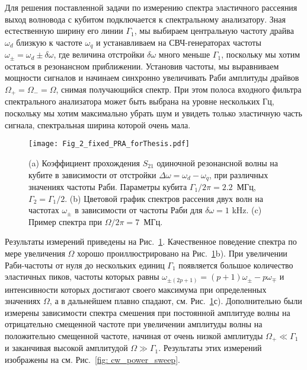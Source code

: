 Для решения поставленной задачи по измерению спектра эластичного рассеяния выход волновода с кубитом подключается к спектральному анализатору.  Зная естественную ширину его линии $\Gamma_1$, мы выбираем центральную частоту драйва $\omega_d$ близкую к частоте $\omega_q$ и устанавливаем на СВЧ-генераторах частоты $\omega_\pm = \omega_d \pm \delta\omega$, где величина отстройки $\delta\omega$ много меньше $\Gamma_1$, поскольку мы хотим остаться в резонансном приближении. Установив частоты, мы выравниваем мощности сигналов и начинаем синхронно увеличивать Раби амплитуды драйвов $\Omega_+ = \Omega_- = \Omega$, снимая получающийся спектр. При этом полоса входного фильтра спектрального анализатора может быть выбрана на уровне нескольких Гц, поскольку мы хотим максимально убрать шум и увидеть только эластичную часть сигнала, спектральная ширина которой очень мала.
\begin{figure}[thb]
	\centering
	\texttt{[image: Fig\_2\_fixed\_PRA\_forThesis.pdf]}
	\caption[Волновое смешение: появление дополнительных компонент эластично рассеянного сигнала]{(a) Коэффициент прохождения $S_{21}$ одиночной резонансной волны на кубите в зависимости от отстройки $\Delta\omega = \omega_d-\omega_q$, при различных значениях частоты Раби. Параметры кубита $\Gamma_1/2\pi = 2.2$~МГц, $\Gamma_2 = \Gamma_1/2$. (b) Цветовой график спектров рассения двух волн на частотах $\omega_{\pm}$ в зависимости от частоты Раби для $\delta\omega = 1$ kHz. (c) Пример спектра при $\Omega/2\pi=7$~МГц. }
	\label{fig: CWM}
\end{figure}
Результаты измерений приведены на Рис.~\ref{fig: CWM}. Качественное поведение спектра по мере увеличения $\Omega$ хорошо проиллюстрировано на Рис.~\ref{fig: CWM}b). При увеличении Раби-частоты от нуля до нескольких единиц $\Gamma_1$ появляется большое количество эластичных пиков, частоты которых равны $\omega_{\pm(2p+1)} = (p+1)\omega_\pm-p\omega_\mp$ и интенсивности которых достигают своего максимума при определенных значениях $\Omega$, а в дальнейшем плавно спадают, см.  Рис.~\ref{fig: CWM}с). Дополнительно были измерены зависимости спектра смешения при постоянной амплитуде волны на отрицательно смещенной частоте при увеличении амплитуды волны на положительно смещенной частоте, начиная от очень низкой амплитуды $\Omega_+ \ll \Gamma_1$ и заканчивая высокой амплитудой $\Omega \gg \Gamma_1$. Результаты этих измерений изображены на см. Рис.~\ref{fig: cw_power_sweep}. 

